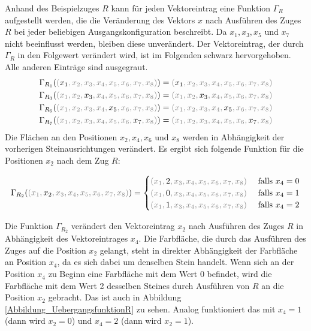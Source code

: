 \documentclass[12pt,a4paper, usenames, dvipsnames]{article}
\theoremstyle{mystyle}
\theoremstyle{definition}
\begin{document}
Anhand des Beispielzuges $R$ kann für jeden Vektoreintrag eine Funktion $\Gamma_R$ aufgestellt werden, die die Veränderung des Vektors $x$ nach Ausführen des Zuges $R$ bei jeder beliebigen Ausgangskonfiguration beschreibt. Da $x_1, x_3, x_5$ und $x_7$ nicht beeinflusst werden, bleiben diese unverändert. Der Vektoreintrag, der durch $\Gamma_R$ in den Folgewert verändert wird, ist im Folgenden schwarz hervorgehoben. Alle anderen Einträge sind ausgegraut.
\begin{align*}
& \Gamma_{R_1}(\textcolor{gray}{(\textcolor{black}{x_1}, x_2, x_3, x_4, x_5, x_6, x_7, x_8  )})=\textcolor{gray}{(\textcolor{black}{x_1}, x_2, x_3, x_4, x_5, x_6, x_7, x_8  )} \\
& \Gamma_{R_3}(\textcolor{gray}{(x_1, x_2, \textcolor{black}{x_3}, x_4, x_5, x_6, x_7, x_8  )})=\textcolor{gray}{(x_1, x_2, \textcolor{black}{x_3}, x_4, x_5, x_6, x_7, x_8  )} \\
& \Gamma_{R_5}(\textcolor{gray}{(x_1, x_2, x_3, x_4, \textcolor{black}{x_5}, x_6, x_7, x_8  )})=\textcolor{gray}{(x_1, x_2, x_3, x_4, \textcolor{black}{x_5}, x_6, x_7, x_8  )}\\
& \Gamma_{R_7}(\textcolor{gray}{(x_1, x_2, x_3, x_4, x_5, x_6,\textcolor{black}{x_7}, x_8  )})=\textcolor{gray}{(x_1, x_2, x_3, x_4, x_5, x_6, \textcolor{black}{x_7}, x_8  )} 
\end{align*}
Die Flächen an den Positionen $x_2, x_4, x_6$ und $x_8$ werden in Abhängigkeit der vorherigen Steinausrichtungen verändert. Es ergibt sich folgende Funktion für die Positionen $x_2$ nach dem Zug $R$: 


\begin{align*}
\Gamma_{R_2}(\textcolor{gray}{(x_1, \textcolor{black}{x_2}, x_3, x_4, x_5, x_6, x_7, x_8  )})= \begin{cases}
\textcolor{gray}{(x_1, \textcolor{black}{2}, x_3, x_4, x_5, x_6, x_7, x_8  )} & \ \text{falls } x_4 = 0 \\ 
\textcolor{gray}{(x_1, \textcolor{black}{0}, x_3, x_4, x_5, x_6, x_7, x_8  )} & \ \text{falls } x_4 = 1 \\
\textcolor{gray}{(x_1, \textcolor{black}{1}, x_3, x_4, x_5, x_6, x_7, x_8  )} & \ \text{falls } x_4 = 2 
\end{cases}
\end{align*}

Die Funktion $\Gamma_{R_2}$ verändert den Vektoreintrag $x_2$ nach Ausführen des Zuges $R$ in Abhängigkeit des Vektoreintrages $x_4$. Die Farbfläche, die durch das Ausführen des Zuges auf die Position $x_2$ gelangt, steht in direkter Abhängigkeit der Farbfläche an Position $x_4$, da es sich dabei um denselben Stein handelt. Wenn sich an der Position $x_4$ zu Beginn eine Farbfläche mit dem Wert 0 befindet, wird die Farbfläche mit dem Wert 2 desselben Steines durch Ausführen von $R$ an die Position $x_2$ gebracht. Das ist auch in Abbildung \ref{Abbildung_UebergangsfunktionR} zu sehen. Analog funktioniert das mit $x_4 = 1$ (dann wird $x_2 = 0$) und $x_4=2$ (dann wird $x_2 = 1$). 
\end{document}
